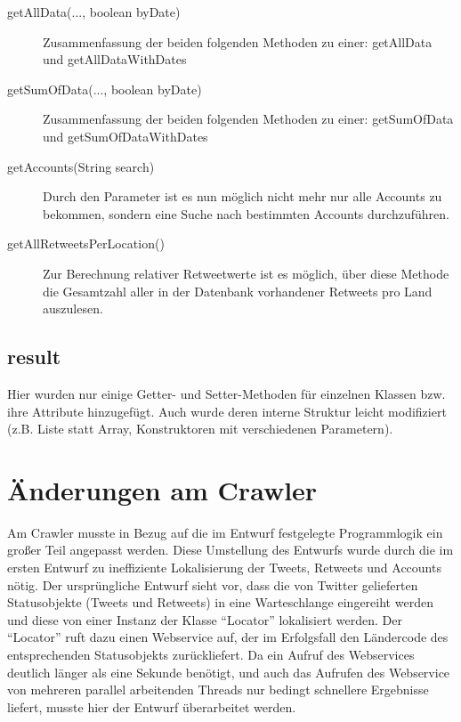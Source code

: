 \begin{itemize}
\begin{description}
		\item[getAllData(..., boolean byDate)] Zusammenfassung der beiden folgenden Methoden zu einer: getAllData und getAllDataWithDates
		\item[getSumOfData(..., boolean byDate)] Zusammenfassung der beiden folgenden Methoden zu einer: getSumOfData und getSumOfDataWithDates
		\item[getAccounts(String search)] Durch den Parameter ist es nun möglich nicht mehr nur alle Accounts zu bekommen, sondern eine Suche nach bestimmten Accounts durchzuführen.
		\item[getAllRetweetsPerLocation()] Zur Berechnung relativer Retweetwerte ist es möglich, über diese Methode die Gesamtzahl aller in der Datenbank vorhandener Retweets pro Land auszulesen.
	\end{description}
\end{itemize}
	
\subsection{result}
Hier wurden nur einige Getter- und Setter-Methoden für einzelnen Klassen bzw. ihre Attribute hinzugefügt. Auch wurde deren interne Struktur leicht modifiziert (z.B. Liste statt Array, Konstruktoren mit verschiedenen Parametern).

\section{Änderungen am Crawler}
Am Crawler musste in Bezug auf die im Entwurf festgelegte Programmlogik ein großer Teil angepasst werden. Diese Umstellung des Entwurfs wurde durch die im ersten Entwurf zu ineffiziente Lokalisierung der Tweets, Retweets und Accounts nötig. Der ursprüngliche Entwurf sieht vor, dass die von Twitter gelieferten Statusobjekte (Tweets und Retweets) in eine Warteschlange eingereiht werden und diese von einer Instanz der Klasse "`Locator"' lokalisiert werden. Der "`Locator"' ruft dazu einen Webservice auf, der im Erfolgsfall den Ländercode des entsprechenden Statusobjekts zurückliefert. Da ein Aufruf des Webservices deutlich länger als eine Sekunde benötigt, und auch das Aufrufen des Webservice von mehreren parallel arbeitenden Threads nur bedingt schnellere Ergebnisse liefert, musste hier der Entwurf überarbeitet werden.

